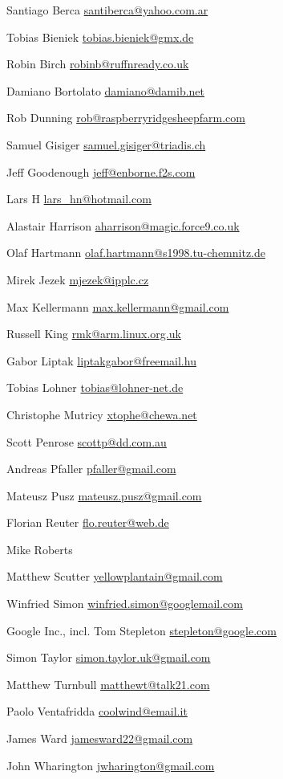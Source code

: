 \item Santiago Berca \url{santiberca@yahoo.com.ar}
\item Tobias Bieniek \url{tobias.bieniek@gmx.de}
\item Robin Birch \url{robinb@ruffnready.co.uk}
\item Damiano Bortolato \url{damiano@damib.net}
\item Rob Dunning \url{rob@raspberryridgesheepfarm.com}
\item Samuel Gisiger \url{samuel.gisiger@triadis.ch}
\item Jeff Goodenough \url{jeff@enborne.f2s.com}
\item Lars H \url{lars_hn@hotmail.com}
\item Alastair Harrison \url{aharrison@magic.force9.co.uk}
\item Olaf Hartmann \url{olaf.hartmann@s1998.tu-chemnitz.de}
\item Mirek Jezek \url{mjezek@ipplc.cz}
\item Max Kellermann \url{max.kellermann@gmail.com}
\item Russell King \url{rmk@arm.linux.org.uk}
\item Gabor Liptak \url{liptakgabor@freemail.hu}
\item Tobias Lohner \url{tobias@lohner-net.de}
\item Christophe Mutricy \url{xtophe@chewa.net}
\item Scott Penrose \url{scottp@dd.com.au}
\item Andreas Pfaller \url{pfaller@gmail.com}
\item Mateusz Pusz \url{mateusz.pusz@gmail.com}
\item Florian Reuter \url{flo.reuter@web.de}
\item Mike Roberts 
\item Matthew Scutter \url{yellowplantain@gmail.com}
\item Winfried Simon \url{winfried.simon@googlemail.com}
\item Google Inc., incl. Tom Stepleton \url{stepleton@google.com}
\item Simon Taylor \url{simon.taylor.uk@gmail.com}
\item Matthew Turnbull \url{matthewt@talk21.com}
\item Paolo Ventafridda \url{coolwind@email.it}
\item James Ward \url{jamesward22@gmail.com}
\item John Wharington \url{jwharington@gmail.com}

